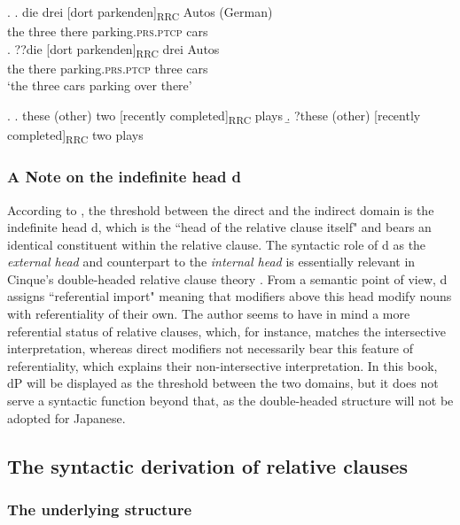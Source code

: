 \ex. \label{numeral rrc german} \ag. die drei [dort parkenden]\textsubscript{RRC} Autos (German)\\
the three there parking.\textsc{prs.ptcp} cars\\
\bg. ??die [dort parkenden]\textsubscript{RRC} drei Autos\\
the there parking.\textsc{prs.ptcp} three cars\\
`the three cars parking over there’

\ex. \label{numeral rrc english} \a. these (other) two [recently completed]\textsubscript{RRC} plays
\b. ?these (other) [recently completed]\textsubscript{RRC} two plays \null \hfill \citep[229]{cinque:2020:relcl}

\subsubsection{A Note on the indefinite head d} \label{indefinitedpdiscussion}

According to \citet{cinque:2010:adj, cinque:2020:relcl}, the threshold between the direct and the indirect domain is the indefinite head d, which is the ``head of the relative clause itself" \citep[34]{cinque:2010:adj} and bears an identical constituent within the relative clause. The syntactic role of d as the \textit{external head} and counterpart to the \textit{internal head} is essentially relevant in Cinque’s double-headed relative clause theory \citep{cinque:2020:relcl}. From a semantic point of view, d assigns ``referential import" \citep[34]{cinque:2010:adj} meaning that modifiers above this head modify nouns with referentiality of their own. The author seems to have in mind a more referential status of relative clauses, which, for instance, matches the intersective interpretation, whereas direct modifiers not necessarily bear this feature of referentiality, which explains their non-intersective interpretation. In this book, dP will be displayed as the threshold between the two domains, but it does not serve a syntactic function beyond that, as the double-headed structure will not be adopted for Japanese. 

\subsection{The syntactic derivation of relative clauses}

\subsubsection{The underlying structure}

